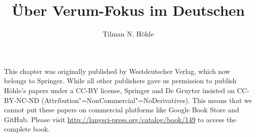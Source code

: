 \documentclass[output=paper]{langsci/langscibook}
\author{Tilman N. Höhle}
\title{Über Verum-Fokus im Deutschen}
\begin{document}
\label{chap-verum-fokus}

\noindent
This chapter was originally published by Westdeutscher Verlag, which now belongs to Springer. While all other publishers gave us permission to publish Höhle's papers under a CC-BY
license, Springer and De Gruyter insisted on CC-BY-NC-ND (Attribution"=NonCommercial"=No\-De\-riv\-a\-tives).
This means that we cannot put these papers on commercial platforms like Google Book Store and GitHub. Please
visit \url{http://langsci-press.org/catalog/book/149} to access the complete book.


\pagebreak~
\setcounter{page}{416}

\label{chap-verum-fokus-end}
\end{document}
